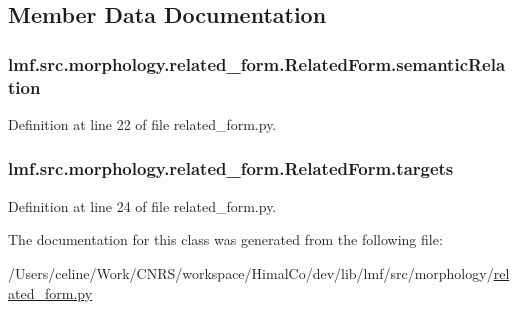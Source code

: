 \subsection{Member Data Documentation}
\hypertarget{classlmf_1_1src_1_1morphology_1_1related__form_1_1_related_form_a55ef34c7db0320aede2a86eff3085d46}{
\subsubsection[{semantic\+Relation}]{\setlength{\rightskip}{0pt plus 5cm}lmf.\+src.\+morphology.\+related\+\_\+form.\+Related\+Form.\+semantic\+Relation}}\label{classlmf_1_1src_1_1morphology_1_1related__form_1_1_related_form_a55ef34c7db0320aede2a86eff3085d46}


Definition at line 22 of file related\+\_\+form.\+py.

\hypertarget{classlmf_1_1src_1_1morphology_1_1related__form_1_1_related_form_a6f5035848e99af2cb539ba660d5c15a3}{
\subsubsection[{targets}]{\setlength{\rightskip}{0pt plus 5cm}lmf.\+src.\+morphology.\+related\+\_\+form.\+Related\+Form.\+targets}}\label{classlmf_1_1src_1_1morphology_1_1related__form_1_1_related_form_a6f5035848e99af2cb539ba660d5c15a3}


Definition at line 24 of file related\+\_\+form.\+py.



The documentation for this class was generated from the following file\+:\begin{DoxyCompactItemize}
\item 
/\+Users/celine/\+Work/\+C\+N\+R\+S/workspace/\+Himal\+Co/dev/lib/lmf/src/morphology/\hyperlink{related__form_8py}{related\+\_\+form.\+py}\end{DoxyCompactItemize}
